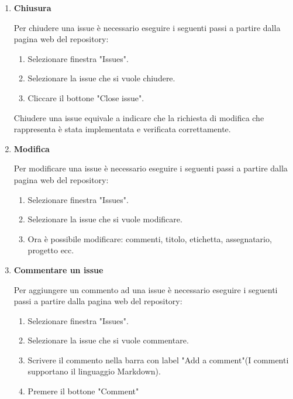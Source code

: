 \begin{enumerate}
    \item \textbf{Chiusura}
    
    Per chiudere una issue è necessario eseguire i seguenti passi a partire dalla pagina web del repository:
    \begin{enumerate}
        \item Selezionare finestra "Issues".
        \item Selezionare la issue che si vuole chiudere.
        \item Cliccare il bottone "Close issue".
    \end{enumerate}
    Chiudere una issue equivale a indicare che la richiesta di modifica che rappresenta è stata implementata e verificata correttamente.

    \item \textbf{Modifica}
    
    Per modificare una issue è necessario eseguire i seguenti passi a partire dalla pagina web del repository:
    \begin{enumerate}
        \item Selezionare finestra "Issues".
        \item Selezionare la issue che si vuole modificare.
        \item Ora è possibile modificare: commenti, titolo, etichetta, assegnatario, progetto ecc.
    \end{enumerate}

    \item \textbf{Commentare un issue}
    
    Per aggiungere un commento ad una issue è necessario eseguire i seguenti passi a partire dalla pagina web del repository:
    \begin{enumerate}
        \item Selezionare finestra "Issues".
        \item Selezionare la issue che si vuole commentare.
        \item Scrivere il commento nella barra con label "Add a comment"(I commenti supportano il linguaggio Markdown).
        \item Premere il bottone "Comment"
    \end{enumerate}
\end{enumerate}

